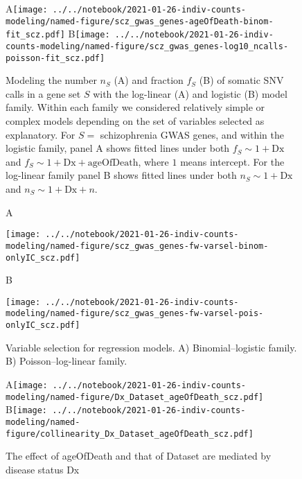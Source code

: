 \documentclass[letterpaper]{article}
\begin{document}
\begin{figure}[p]
\begin{center}
A\texttt{[image: ../../notebook/2021-01-26-indiv-counts-modeling/named-figure/scz\_gwas\_genes-ageOfDeath-binom-fit\_scz.pdf]}
B\texttt{[image: ../../notebook/2021-01-26-indiv-counts-modeling/named-figure/scz\_gwas\_genes-log10\_ncalls-poisson-fit\_scz.pdf]}
\end{center}
\caption{
Modeling the number $n_S$ (A) and fraction $f_S$ (B) of somatic SNV calls in a
gene set $S$ with the log-linear (A) and logistic (B) model family.  Within
each family we considered relatively simple or complex models depending on the
set of variables selected as explanatory.  For \(S =\) schizophrenia GWAS
genes, and within the logistic family, panel A shows
fitted lines under both \(f_S \sim 1 + \mathrm{Dx}\) and \(f_S \sim 1 +
\mathrm{Dx} + \mathrm{ageOfDeath}\), where \(1\) means intercept.
For the log-linear family panel B shows fitted lines under both \(n_S \sim 1 +
\mathrm{Dx}\) and \(n_S \sim 1 + \mathrm{Dx} + n\).
}
\label{fig:fitted-lines}
\end{figure}

\begin{figure}[p]
\begin{center}
A

\texttt{[image: ../../notebook/2021-01-26-indiv-counts-modeling/named-figure/scz\_gwas\_genes-fw-varsel-binom-onlyIC\_scz.pdf]}

B

\texttt{[image: ../../notebook/2021-01-26-indiv-counts-modeling/named-figure/scz\_gwas\_genes-fw-varsel-pois-onlyIC\_scz.pdf]}
\end{center}
\caption{
Variable selection for regression models. A) Binomial--logistic
family.  B) Poisson--log-linear family.
}
\label{fig:varsel}
\end{figure}

\begin{figure}[p]
\begin{center}
A\texttt{[image: ../../notebook/2021-01-26-indiv-counts-modeling/named-figure/Dx\_Dataset\_ageOfDeath\_scz.pdf]}
B\texttt{[image: ../../notebook/2021-01-26-indiv-counts-modeling/named-figure/collinearity\_Dx\_Dataset\_ageOfDeath\_scz.pdf]}
\end{center}
\caption{
The effect of ageOfDeath and that of Dataset are mediated by disease status Dx
}
\label{fig:d-separation}
\end{figure}
\end{document}
